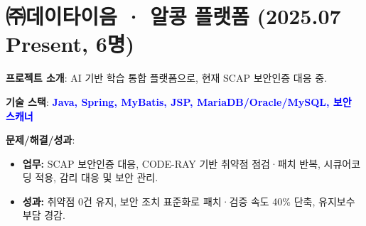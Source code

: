 \documentclass[a4paper,11pt]{article}
\newcommand{\tech}[1]{\textbf{\textcolor{blue}{#1}}}
\begin{document}
\section{㈜데이타이음 · 알콩 플랫폼 (2025.07 ~ Present, 6명)}

\textbf{프로젝트 소개}:  
AI 기반 학습 통합 플랫폼으로, 현재 SCAP 보안인증 대응 중.  

\textbf{기술 스택}: \tech{Java, Spring, MyBatis, JSP, MariaDB/Oracle/MySQL, 보안 스캐너}  

\textbf{문제/해결/성과}:
\begin{itemize}[leftmargin=*]
  \item \textbf{업무:} SCAP 보안인증 대응, CODE-RAY 기반 취약점 점검·패치 반복, 시큐어코딩 적용, 감리 대응 및 보안 관리.
  \item \textbf{성과:} 취약점 0건 유지, 보안 조치 표준화로 패치·검증 속도 40\% 단축, 유지보수 부담 경감.
\end{itemize}
\end{document}
